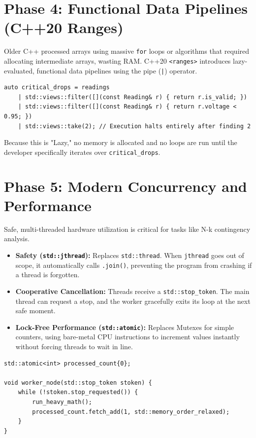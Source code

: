 \documentclass[11pt,a4paper]{article}
\begin{document}
\section{Phase 4: Functional Data Pipelines (C++20 Ranges)}
Older C++ processed arrays using massive \texttt{for} loops or algorithms that required allocating intermediate arrays, wasting RAM. C++20 \texttt{<ranges>} introduces lazy-evaluated, functional data pipelines using the pipe (\texttt{|}) operator.

\begin{lstlisting}[caption={Phase 4: Lazy Evaluation Pipelines}]
auto critical_drops = readings 
    | std::views::filter([](const Reading& r) { return r.is_valid; })
    | std::views::filter([](const Reading& r) { return r.voltage < 0.95; })
    | std::views::take(2); // Execution halts entirely after finding 2
\end{lstlisting}
Because this is "Lazy," no memory is allocated and no loops are run until the developer specifically iterates over \texttt{critical\_drops}.

\section{Phase 5: Modern Concurrency and Performance}
Safe, multi-threaded hardware utilization is critical for tasks like N-k contingency analysis.

\begin{itemize}
    \item \textbf{Safety (\texttt{std::jthread}):} Replaces \texttt{std::thread}. When \texttt{jthread} goes out of scope, it automatically calls \texttt{.join()}, preventing the program from crashing if a thread is forgotten.
    \item \textbf{Cooperative Cancellation:} Threads receive a \texttt{std::stop\_token}. The main thread can request a stop, and the worker gracefully exits its loop at the next safe moment.
    \item \textbf{Lock-Free Performance (\texttt{std::atomic}):} Replaces Mutexes for simple counters, using bare-metal CPU instructions to increment values instantly without forcing threads to wait in line.
\end{itemize}

\begin{lstlisting}[caption={Phase 5: Safe Concurrency}]
std::atomic<int> processed_count{0};

void worker_node(std::stop_token stoken) {
    while (!stoken.stop_requested()) {
        run_heavy_math();
        processed_count.fetch_add(1, std::memory_order_relaxed);
    }
}
\end{lstlisting}
\end{document}
